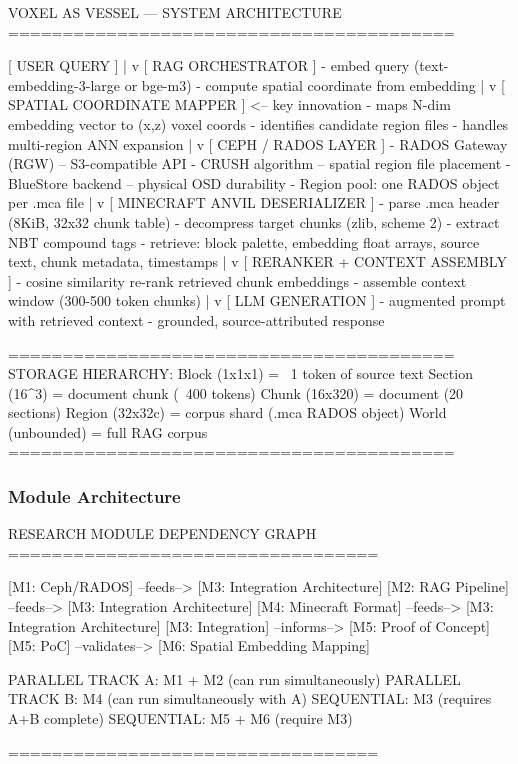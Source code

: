 \documentclass[11pt,letterpaper]{article}
\begin{document}
\begin{asciibox}
VOXEL AS VESSEL --- SYSTEM ARCHITECTURE
=========================================

  [ USER QUERY ]
       |
       v
  [ RAG ORCHESTRATOR ]
  - embed query (text-embedding-3-large or bge-m3)
  - compute spatial coordinate from embedding
       |
       v
  [ SPATIAL COORDINATE MAPPER ]             <-- key innovation
  - maps N-dim embedding vector to (x,z) voxel coords
  - identifies candidate region files
  - handles multi-region ANN expansion
       |
       v
  [ CEPH / RADOS LAYER ]
  - RADOS Gateway (RGW) -- S3-compatible API
  - CRUSH algorithm -- spatial region file placement
  - BlueStore backend -- physical OSD durability
  - Region pool: one RADOS object per .mca file
       |
       v
  [ MINECRAFT ANVIL DESERIALIZER ]
  - parse .mca header (8KiB, 32x32 chunk table)
  - decompress target chunks (zlib, scheme 2)
  - extract NBT compound tags
  - retrieve: block palette, embedding float arrays,
              source text, chunk metadata, timestamps
       |
       v
  [ RERANKER + CONTEXT ASSEMBLY ]
  - cosine similarity re-rank retrieved chunk embeddings
  - assemble context window (300-500 token chunks)
       |
       v
  [ LLM GENERATION ]
  - augmented prompt with retrieved context
  - grounded, source-attributed response

=========================================
STORAGE HIERARCHY:
  Block    (1x1x1)   = ~1 token of source text
  Section  (16^3)    = document chunk (~400 tokens)
  Chunk    (16x320)  = document (20 sections)
  Region   (32x32c)  = corpus shard (.mca RADOS object)
  World    (unbounded) = full RAG corpus
=========================================
\end{asciibox}

\subsubsection{Module Architecture}

\begin{asciibox}
RESEARCH MODULE DEPENDENCY GRAPH
==================================

  [M1: Ceph/RADOS] --feeds--> [M3: Integration Architecture]
  [M2: RAG Pipeline] --feeds--> [M3: Integration Architecture]
  [M4: Minecraft Format] --feeds--> [M3: Integration Architecture]
  [M3: Integration] --informs--> [M5: Proof of Concept]
  [M5: PoC] --validates--> [M6: Spatial Embedding Mapping]

  PARALLEL TRACK A: M1 + M2 (can run simultaneously)
  PARALLEL TRACK B: M4 (can run simultaneously with A)
  SEQUENTIAL: M3 (requires A+B complete)
  SEQUENTIAL: M5 + M6 (require M3)

==================================
\end{asciibox}
\end{document}

